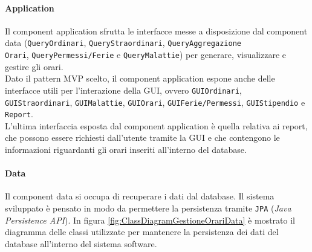 \paragraph{Application}
Il component application sfrutta le interfacce messe a disposizione dal component data (\verb|QueryOrdinari|, \verb|QueryStraordinari|, \verb|QueryAggregazione|\\ \verb|Orari|, \verb|QueryPermessi/Ferie| e \verb|QueryMalattie|) per generare, visualizzare e gestire gli orari.\\

\noindent
Dato il pattern MVP scelto, il component application espone anche delle interfacce utili per l'interazione della GUI, ovvero \verb|GUIOrdinari|, \verb|GUIStraordinari|, \verb|GUIMalattie|, \verb|GUIOrari|, \verb|GUIFerie/Permessi|, \verb|GUIStipendio| e \verb|Report|.\\

\noindent
L'ultima interfaccia esposta dal component application è quella relativa ai report, che possono essere richiesti dall'utente tramite la GUI e che contengono le informazioni riguardanti gli orari inseriti all'interno del database.
\paragraph{Data}
Il component data si occupa di recuperare i dati dal database. Il sistema sviluppato è pensato in modo da permettere la persistenza tramite \verb|JPA| (\textit{Java Persistence API}). In figura \ref{fig:ClassDiagramGestioneOrariData} è mostrato il diagramma delle classi utilizzate per mantenere la persistenza dei dati del database all'interno del sistema software.
